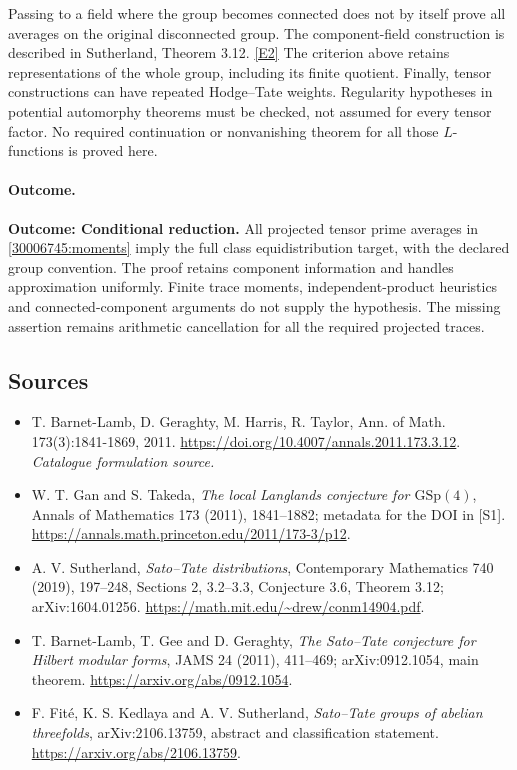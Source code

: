 \documentclass[11pt,a4paper]{article}
\newcommand{\eref}[2]{\hyperlink{extra:#1:#2}{[E#2]}}
\numberwithin{equation}{section}
\begin{document}
Passing to a field where the group becomes connected does not by itself
prove all averages on the original disconnected group. The component-field
construction is described in Sutherland, Theorem 3.12. \eref{30006745}{2}
The criterion above retains representations of the whole group, including
its finite quotient. Finally, tensor constructions can have repeated
Hodge--Tate weights. Regularity hypotheses in potential automorphy theorems
must be checked, not assumed for every tensor factor. No required
continuation or nonvanishing theorem for all those $L$-functions is proved
here.

\paragraph{Outcome.}
\textbf{Outcome: Conditional reduction.}
All projected tensor prime averages in \eqref{30006745:moments} imply the full
class equidistribution target, with the declared group convention. The
proof retains component information and handles approximation uniformly.
Finite trace moments, independent-product heuristics and connected-component
arguments do not supply the hypothesis. The missing assertion remains
arithmetic cancellation for all the required projected traces.

\subsection{Sources}
\begin{itemize}\raggedright
\item[\textnormal{[S1]}]\hypertarget{source:30006745:1}{} T. Barnet-Lamb, D. Geraghty, M. Harris, R. Taylor, Ann. of Math. 173(3):1841-1869, 2011.
\url{https://doi.org/10.4007/annals.2011.173.3.12}.
{\small\textit{Catalogue formulation source.}}
\item[\textnormal{[E1]}]\hypertarget{extra:30006745:1}{} W. T. Gan and S. Takeda,
\emph{The local Langlands conjecture for $\mathrm{GSp}(4)$}, Annals of
Mathematics 173 (2011), 1841--1882; metadata for the DOI in [S1].
\url{https://annals.math.princeton.edu/2011/173-3/p12}.
\item[\textnormal{[E2]}]\hypertarget{extra:30006745:2}{} A. V. Sutherland,
\emph{Sato--Tate distributions}, Contemporary Mathematics 740 (2019),
197--248, Sections 2, 3.2--3.3, Conjecture 3.6, Theorem 3.12;
arXiv:1604.01256. \url{https://math.mit.edu/~drew/conm14904.pdf}.
\item[\textnormal{[E3]}]\hypertarget{extra:30006745:3}{} T. Barnet-Lamb, T. Gee
and D. Geraghty, \emph{The Sato--Tate conjecture for Hilbert modular forms},
JAMS 24 (2011), 411--469; arXiv:0912.1054, main theorem.
\url{https://arxiv.org/abs/0912.1054}.
\item[\textnormal{[E4]}]\hypertarget{extra:30006745:4}{} F. Fit\'e, K. S. Kedlaya
and A. V. Sutherland, \emph{Sato--Tate groups of abelian threefolds},
arXiv:2106.13759, abstract and classification statement.
\url{https://arxiv.org/abs/2106.13759}.

\end{itemize}
\end{document}
